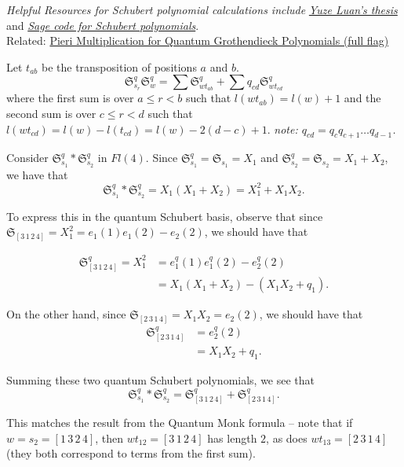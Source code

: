 \textit{Helpful Resources for Schubert polynomial calculations include}
\href{https://www.math.ucdavis.edu/~webfiles/undergrad_thesis/202003_Yuze_Luan_Carlsson_Thesis.pdf}{\textit{Yuze Luan's thesis}} and \href{https://doc.sagemath.org/html/en/reference/combinat/sage/combinat/schubert_polynomial.html}{\textit{Sage code for Schubert polynomials}}. \\

Related: \href{https://arxiv.org/pdf/2211.01578}{Pieri Multiplication for Quantum Grothendieck Polynomials (full flag)} \\

\begin{theorem*}
Let $t_{ab}$ be the transposition of positions $a$ and $b$.
    \[
        \mathfrak{S}_{s_r}^q \mathfrak{S}_{w}^q = \sum \mathfrak{S}_{wt_{ab}}^q + \sum q_{cd}\mathfrak{S}_{wt_{cd}}^q
    \]
    where the first sum is over $a \leq r < b$ such that $l(wt_{ab}) = l(w) + 1$ and the second sum is over $c \leq r < d$ such that $l(wt_{cd}) = l(w) - l(t_{cd}) = l(w) - 2(d - c) + 1$. \textit{note: $q_{cd} = q_c q_{c+1} \dots q_{d-1}$.}
\end{theorem*}


\begin{eg}
Consider $\mathfrak{S}^q_{s_1} \ast \mathfrak{S}^q_{s_2}$ in $Fl(4)$. Since $\mathfrak{S}^q_{s_1} = \mathfrak{S}_{s_1} = X_1$ and $\mathfrak{S}^q_{s_2} = \mathfrak{S}_{s_2} = X_1 + X_2$, we have that
\[
    \mathfrak{S}^q_{s_1} \ast \mathfrak{S}^q_{s_2} = X_1(X_1 + X_2) = X_1^2 + X_1X_2.
\]

To express this in the quantum Schubert basis, observe that since $\mathfrak{S}_{[3\,1\,2\,4]} = X_1^2 = e_1(1)e_1(2) - e_2(2)$, we should have that

\begin{align*}
\mathfrak{S}^q_{[3\,1\,2\,4]} = X_1^2 &= e^q_1(1)e^q_1(2) - e^q_2(2) \\
&= X_1(X_1 + X_2) - (X_1X_2 + q_1).
\end{align*}

On the other hand, since $\mathfrak{S}_{[2\,3\,1\,4]} = X_1X_2 = e_2(2)$, we should have that
\begin{align*}
    \mathfrak{S}^q_{[2\,3\,1\,4]} &= e^q_2(2) \\
    &= X_1X_2 + q_1.
\end{align*}

Summing these two quantum Schubert polynomials, we see that
\[
    \boxed{\mathfrak{S}^q_{s_1} \ast \mathfrak{S}^q_{s_2} = \mathfrak{S}^q_{[3\,1\,2\,4]} + \mathfrak{S}^q_{[2\,3\,1\,4]}}.
\]

This matches the result from the Quantum Monk formula -- note that if $w = s_2 = [1\,3\,2\,4]$, then $wt_{12} = [3\,1\,2\,4]$ has length $2$, as does $wt_{13} = [2\,3\,1\,4]$ (they both correspond to terms from the first sum).
\end{eg}


